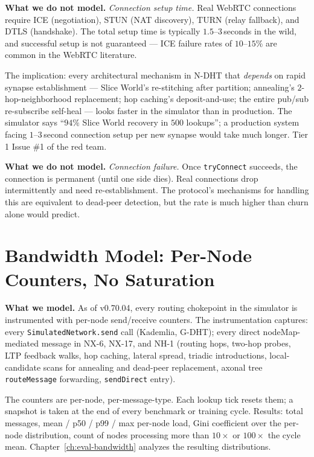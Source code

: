\documentclass[twoside,nobib]{tufte-book}
\newcommand{\NDHT}{N-DHT\xspace}
\newcommand{\GDHT}{G-DHT\xspace}
\begin{document}
\textbf{What we do not model.} \emph{Connection setup time.} Real
WebRTC connections require ICE (negotiation), STUN (NAT
discovery), TURN (relay fallback), and DTLS (handshake). The
total setup time is typically $1.5$--$3$\,seconds in the wild,
and successful setup is not guaranteed --- ICE failure rates of
$10$--$15\%$ are common in the WebRTC literature.

The implication: every architectural mechanism in \NDHT that
\emph{depends} on rapid synapse establishment --- Slice World's
re-stitching after partition; annealing's
$2$-hop-neighborhood replacement; hop caching's deposit-and-use;
the entire pub/sub re-subscribe self-heal --- looks faster in
the simulator than in production. The simulator says
``$94\%$ Slice World recovery in $500$ lookups''; a production
system facing $1$--$3$\,second connection setup per new
synapse would take much longer. Tier 1 Issue \#1 of the red team.

\textbf{What we do not model.} \emph{Connection failure.} Once
\texttt{tryConnect} succeeds, the connection is permanent
(until one side dies). Real connections drop intermittently and
need re-establishment. The protocol's mechanisms for handling
this are equivalent to dead-peer detection, but the rate is much
higher than churn alone would predict.

\section{Bandwidth Model: Per-Node Counters, No Saturation}

\textbf{What we model.} As of v0.70.04, every routing chokepoint
in the simulator is instrumented with per-node send/receive
counters. The instrumentation captures: every
\texttt{SimulatedNetwork.send} call (Kademlia, \GDHT); every
direct nodeMap-mediated message in NX-6, NX-17, and NH-1
(routing hops, two-hop probes, LTP feedback walks, hop caching,
lateral spread, triadic introductions, local-candidate scans for
annealing and dead-peer replacement, axonal tree
\texttt{routeMessage} forwarding, \texttt{sendDirect} entry).

The counters are per-node, per-message-type. Each lookup tick
resets them; a snapshot is taken at the end of every benchmark
or training cycle. Results: total messages, mean / p50 / p99 /
max per-node load, Gini coefficient over the per-node
distribution, count of nodes processing more than $10\times$ or
$100\times$ the cycle mean. Chapter~\ref{ch:eval-bandwidth}
analyzes the resulting distributions.
\end{document}
